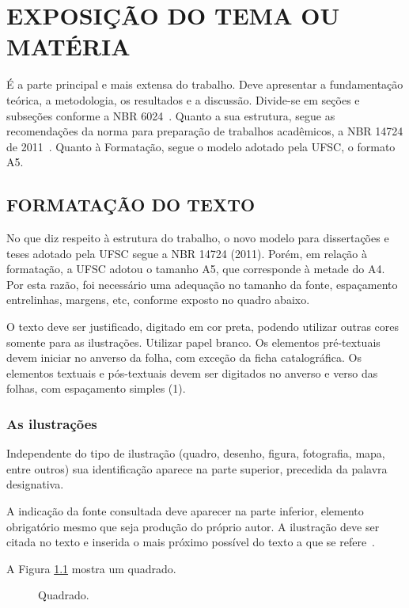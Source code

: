 \chapter{EXPOSIÇÃO DO TEMA OU MATÉRIA}

É a parte principal e mais extensa do trabalho.
Deve apresentar a fundamentação teórica,
a metodologia,
os resultados
e a discussão.
Divide-se em seções e subseções
conforme a NBR 6024~\cite{abnt14724}.
Quanto a sua estrutura,
segue as recomendações da norma
para preparação de trabalhos acadêmicos,
a NBR 14724 de 2011~\cite{abnt14724}.
Quanto à Formatação,
segue o modelo adotado pela UFSC, o formato A5.

\section{FORMATAÇÃO DO TEXTO}

No que diz respeito à estrutura do trabalho,
o novo modelo para dissertações e teses
adotado pela UFSC
segue a NBR 14724 (2011).
Porém, em relação à formatação,
a UFSC adotou o tamanho A5,
que corresponde à metade do A4.
Por esta razão,
foi necessário uma adequação no tamanho da fonte,
espaçamento entrelinhas,
margens,
etc,
conforme exposto no quadro abaixo.

O texto deve ser justificado,
digitado em cor preta,
podendo utilizar outras cores
somente para as ilustrações.
Utilizar papel branco.
Os elementos pré-textuais
devem iniciar no anverso da folha,
com exceção da ficha catalográfica.
Os elementos textuais e pós-textuais
devem ser digitados no anverso e verso das folhas,
com espaçamento simples (1).

\subsection{As ilustrações}

Independente do tipo de ilustração
(quadro, desenho, figura, fotografia, mapa, entre outros)
sua identificação aparece na parte superior,
precedida da palavra designativa.

A indicação da fonte consultada
deve aparecer na parte inferior,
elemento obrigatório mesmo que seja produção do próprio autor.
A ilustração deve ser citada no texto
e inserida o mais próximo possível do texto
a que se refere~\cite{abnt14724}.

A Figura \ref{fig:a} mostra um quadrado.
\begin{figure}[!htb]
   \centering
   \caption{Quadrado.}\label{fig:a}
\end{figure}


